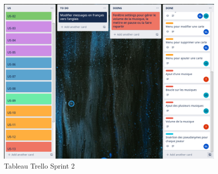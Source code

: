 \begin{figure}[ht]
	\centering
	\includegraphics[width=\textwidth]{trello_2.png}
	\caption{Tableau Trello Sprint 2}
	\label{Tableau Trello Sprint 2}
\end{figure}
